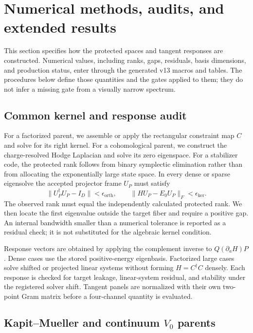 \section{Numerical methods, audits, and extended results}
\label{app:numerics}

This section specifies how the protected spaces and tangent responses are
constructed.  Numerical values, including ranks, gaps, residuals, basis
dimensions, and production status, enter through the generated v13 macros and
tables.  The procedures below define those quantities and the gates applied to
them; they do not infer a missing gate from a visually narrow spectrum.

\subsection{Common kernel and response audit}

For a factorized parent, we assemble or apply the rectangular constraint map
$C$ and solve for its right kernel.  For a cohomological parent, we construct
the charge-resolved Hodge Laplacian and solve its zero eigenspace.  For a
stabilizer code, the protected rank follows from binary symplectic elimination
rather than from allocating the exponentially large state space.  In every
dense or sparse eigensolve the accepted projector frame $U_P$ must satisfy
\[
 \lVert U_P^\dagger U_P-I_D\rVert<\epsilon_{\mathrm{orth}},
 \qquad
 \lVert HU_P-E_0U_P\rVert_F<\epsilon_{\mathrm{ker}}.
\]
The observed rank must equal the independently calculated protected rank.  We
then locate the first eigenvalue outside the target fiber and require a
positive gap.  An internal bandwidth smaller than a numerical tolerance is
reported as a residual check; it is not substituted for the algebraic kernel
condition.

Response vectors are obtained by applying the complement inverse to
$Q(\partial_aH)P$.  Dense cases use the stored positive-energy eigenbasis.
Factorized large cases solve shifted or projected linear systems without
forming $H=C^\dagger C$ densely.  Each response is checked for target leakage,
linear-system residual, and stability under the registered solver shift.
Tangent panels are normalized with their own two-point Gram matrix before a
four-channel quantity is evaluated.

\subsection{Kapit--Mueller and continuum $V_0$ parents}

